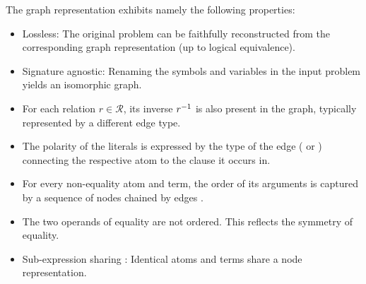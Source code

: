 The graph representation exhibits namely the following properties:
\begin{itemize}
\item Lossless: The original problem can be faithfully reconstructed from the corresponding graph representation
(up to logical equivalence).
\item Signature agnostic: Renaming the symbols and variables in the input problem yields an isomorphic graph.
\item For each relation $r \in \mathcal{R}$, its inverse $r^{-1}$ is also present in the graph,
typically represented by a different edge type.
\item The polarity of the literals is expressed by the type of the edge (\epos{} or \eneg{})
connecting the respective atom to the clause it occurs in.
\item For every non-equality atom and term, the order of its arguments is captured by a sequence of  nodes chained by edges \cite{Rawson2020}.
\item The two operands of equality are not ordered.
This reflects the symmetry of equality.
\item Sub-expression sharing \cite{Chvalovsky2019,Olsak2019,Rawson2020}:
Identical atoms and terms share a node representation.
\end{itemize}

